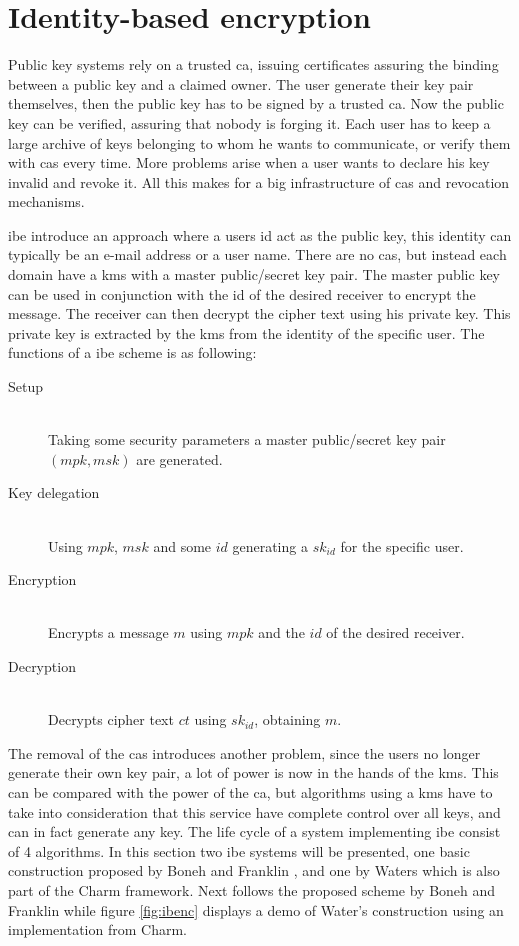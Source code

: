 \section{Identity-based encryption}\label{subsec:IBE}
Public key systems rely on a trusted \gls{ca}, issuing certificates assuring the binding between a public key and a claimed owner. The user generate their key pair themselves, then the public key has to be signed by a trusted \glsdesc{ca}. Now the public key can be verified, assuring that nobody is forging it. Each user has to keep a large archive of keys belonging to whom he wants to communicate, or verify them with \glspl{ca} every time. More problems arise when a user wants to declare his key invalid and revoke it. All this makes for a big infrastructure of \glspl{ca} and revocation mechanisms. 
\par \Gls{ibe} \cite{DBLP:ibe} introduce an approach where a users id act as the public key, this identity can typically be an e-mail address or a user name. There are no \glspl{ca}, but instead each domain have a \gls{kms} with a master public/secret key pair. The master public key can be used in conjunction with the id of the desired receiver to encrypt the message. The receiver can then decrypt the cipher text using his private key. This private key is extracted by the \gls{kms} from the identity of the specific user. 
The functions of a \gls{ibe} scheme is as following:
\begin{description}
\item[Setup]\hfill \\ Taking some security parameters a master public/secret key pair $(mpk, msk)$ are generated.
\item[Key delegation]\hfill \\Using $mpk$, $msk$ and some $id$ generating a $sk_{id}$ for the specific user. 
\item[Encryption]\hfill \\ Encrypts a message $m$ using $mpk$ and the $id$ of the desired receiver. 
\item[Decryption] \hfill \\Decrypts cipher text $ct$ using $sk_{id}$, obtaining $m$. 
\end{description}
The removal of the \glspl{ca} introduces another problem, since the users no longer generate their own key pair, a lot of power is now in the hands of the \gls{kms}. This can be compared with the power of the \gls{ca}, but algorithms using a \gls{kms} have to take into consideration that this service have complete control over all keys, and can in fact generate any key. The life cycle of a system implementing \gls{ibe} consist of 4 algorithms. In this section two \gls{ibe} systems will be presented, one basic construction proposed by Boneh and Franklin \cite{DBLP:ibe}, and one by Waters \cite{ibe_waters09} which is also part of the Charm framework. Next follows the proposed scheme by Boneh and Franklin while figure \ref{fig:ibenc} displays a demo of Water's \cite{ibe_waters09} construction using an implementation from Charm.


